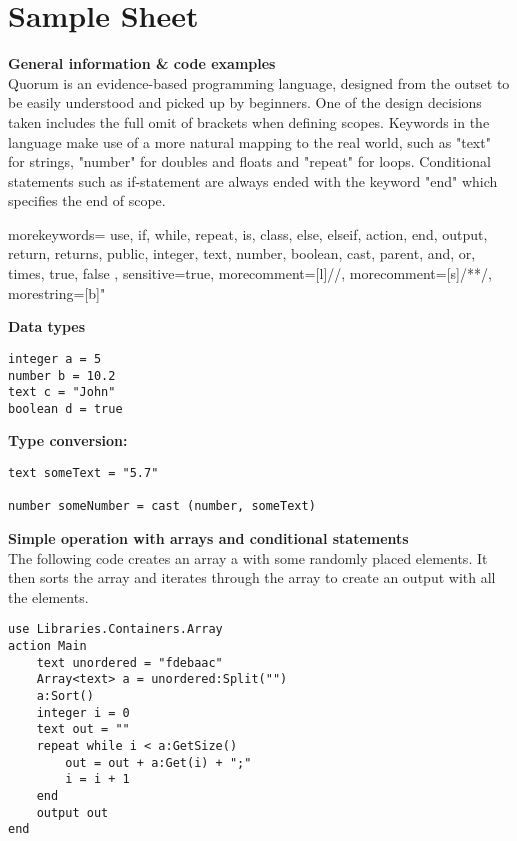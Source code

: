 \chapter{Sample Sheet}
\label{chapter:sampleSheet}
\textbf{General information \& code examples}\\
Quorum is an evidence-based programming language, designed from the outset to be easily understood and picked up by beginners. One of the design decisions taken includes the full omit of brackets when defining scopes. Keywords in the language make use of a more natural mapping to the real world, such as "text" for strings, "number" for doubles and floats  and "repeat" for loops. Conditional statements such as if-statement are always ended with the keyword "end" which specifies the end of scope.

{
  morekeywords={
    use,
    if,
    while,
    repeat,
    is,
    class,
    else,
    elseif,
    action,
    end,
    output,
    return,
    returns,
    public,
    integer,
    text,
    number,
    boolean,
    cast,
    parent,
    and,
    or,
    times,
    true,
    false
  },
  sensitive=true, %
  morecomment=[l]{//}, %
  morecomment=[s]{/*}{*/}, %
  morestring=[b]" %
}

\textbf{Data types}\\
\begin{lstlisting}[language=Quorum]
integer a = 5
number b = 10.2
text c = "John"
boolean d = true
\end{lstlisting}

\textbf{Type conversion:}\\
\begin{lstlisting}[language=Quorum]
text someText = "5.7"

number someNumber = cast (number, someText)
\end{lstlisting}

\textbf{Simple operation with arrays and conditional statements}\\
The following code creates an array a with some randomly placed elements. It then sorts the array and iterates through the array to create an output with all the elements.

\begin{lstlisting}[language=Quorum]
use Libraries.Containers.Array
action Main
	text unordered = "fdebaac"
	Array<text> a = unordered:Split("")
	a:Sort()
	integer i = 0
	text out = ""
	repeat while i < a:GetSize()
		out = out + a:Get(i) + ";"
		i = i + 1
	end
	output out
end
\end{lstlisting}

